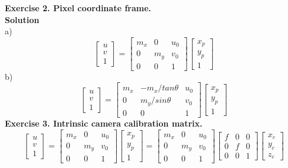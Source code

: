 \documentclass[letterpaper, 11pt]{article}
\begin{document}
\textbf{Exercise 2. Pixel coordinate frame.}\\
\textbf{Solution}\\
a)
$$
    \begin{bmatrix}
        u \\
        v \\
        1
    \end{bmatrix}=
    \begin{bmatrix}
        m_x & 0   & u_0 \\
        0   & m_y & v_0 \\
        0   & 0   & 1
    \end{bmatrix}
    \begin{bmatrix}
        x_p \\
        y_p \\
        1
    \end{bmatrix}$$
b)
$$
    \begin{bmatrix}
        u \\
        v \\
        1
    \end{bmatrix}=
    \begin{bmatrix}
        m_x & - m_x /tan\theta & u_0 \\
        0   & m_y/sin\theta    & v_0 \\
        0   & 0                & 1
    \end{bmatrix}
    \begin{bmatrix}
        x_p \\
        y_p \\
        1
    \end{bmatrix}$$
\textbf{Exercise 3. Intrinsic camera calibration matrix.}\\
$$
    \begin{bmatrix}
        u \\
        v \\
        1
    \end{bmatrix}=
    \begin{bmatrix}
        m_x & 0   & u_0 \\
        0   & m_y & v_0 \\
        0   & 0   & 1
    \end{bmatrix}
    \begin{bmatrix}
        x_p \\
        y_p \\
        1
    \end{bmatrix}
    =
    \begin{bmatrix}
        m_x & 0   & u_0 \\
        0   & m_y & v_0 \\
        0   & 0   & 1
    \end{bmatrix}
    \begin{bmatrix}
        f & 0 & 0 \\
        0 & f & 0 \\
        0 & 0 & 1
    \end{bmatrix}
    \begin{bmatrix}
        x_c \\
        y_c \\
        z_c
    \end{bmatrix}
$$
\end{document}
